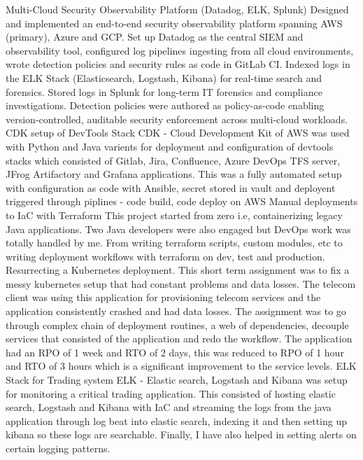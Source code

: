 \vspace{-3mm}
\cvproject
{Multi-Cloud Security Observability Platform (Datadog, ELK, Splunk)}
{Designed and implemented an end-to-end security observability platform spanning AWS (primary), Azure and GCP. Set up Datadog as the central SIEM and observability tool, configured log pipelines ingesting from all cloud environments, wrote detection policies and security rules as code in GitLab CI. Indexed logs in the ELK Stack (Elasticsearch, Logstash, Kibana) for real-time search and forensics. Stored logs in Splunk for long-term IT forensics and compliance investigations. Detection policies were authored as policy-as-code enabling version-controlled, auditable security enforcement across multi-cloud workloads.}
\cvproject
{CDK setup of DevTools Stack}
{CDK - Cloud Development Kit of AWS was used with Python and Java varients for deployment and configuration of devtools stacks which consisted of Gitlab, Jira, Confluence, Azure DevOps TFS server, JFrog Artifactory and Grafana applications. This was a fully automated setup with configuration as code with Ansible, secret stored in vault and deployent triggered through piplines - code build, code deploy on AWS}
\cvproject
{Manual deployments to IaC with Terraform}
{This project started from zero i.e, containerizing legacy Java applications. Two Java developers were also engaged but DevOps work was totally handled by me. From writing terraform scripts, custom modules, etc to writing deployment workflows with terraform on dev, test and production.}
\cvproject
{Resurrecting a Kubernetes deployment.}
{This short term assignment was to fix a messy kubernetes setup that had constant problems and data losses. The telecom client was using this application for provisioning telecom services and the application consistently crashed and had data losses. The assignment was to go through complex chain of deployment routines, a web of dependencies, decouple services that consisted of the application and redo the workflow. The application had an RPO of 1 week and RTO of 2 days, this was reduced to RPO of 1 hour and RTO of 3 hours which is a significant improvement to the service levels. }
\cvproject
{ELK Stack for Trading system}
{ELK - Elastic search, Logstash and Kibana was setup for monitoring a critical trading application. This consisted of hosting elastic search, Logstash and Kibana with IaC and streaming the logs from the java application through log beat into elastic search, indexing it and then setting up kibana so these logs are searchable. Finally, I have also helped in setting alerts on certain logging patterns.}
\vspace{-2mm}